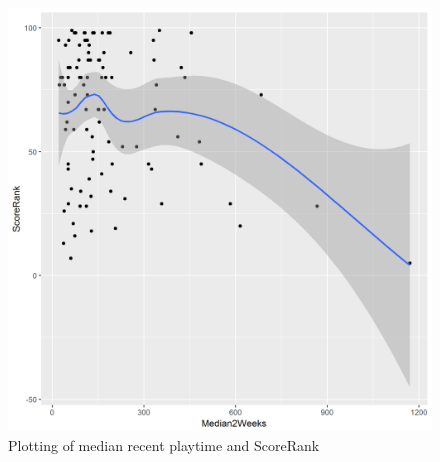 \documentclass[figures_tabs.tex]{subfiles}
\begin{document}
\begin{figure}[H]
    \centering
    \includegraphics[scale=0.5]{img/med_t.png}
    \caption{Plotting of median recent playtime and ScoreRank}
    \label{fig:med_t}
\end{figure}

\end{document}
